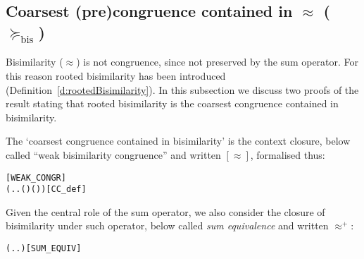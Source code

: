 
\subsection{Coarsest (pre)congruence contained in $\approx$ ($\succeq_{\mathrm{bis}}$)}
\label{s:coarsest}


Bisimilarity ($\approx$) is not  congruence, since not preserved by 
the sum operator. For this reason rooted bisimilarity has been
introduced (Definition~\ref{d:rootedBisimilarity}). 
In this subsection we discuss  two proofs of the result stating that
rooted bisimilarity is the coarsest congruence contained in
bisimilarity.

The `coarsest congruence contained in bisimilarity' is 
the context closure, below called 
``weak bisimilarity congruence'' and written $[\approx]$, formalised thus:
\begin{alltt}
 \HOLSymConst{=}  \hfill{[WEAK_CONGR]}
  \HOLSymConst{=} (\HOLTokenLambda{} . \HOLSymConst{\HOLTokenForall{}}.   \HOLSymConst{\HOLTokenImp{}}  ( ) ( ))\hfill{[CC_def]}
\end{alltt}

Given the central role of the  
 sum operator, we also consider the closure of bisimilarity under such
 operator, 
below called \emph{sum equivalence} and written $\approx^+$:
\begin{alltt}
 \HOLSymConst{=} (\HOLTokenLambda{} . \HOLSymConst{\HOLTokenForall{}}.  \HOLSymConst{+}  \HOLSymConst{\HOLTokenWeakEQ}  \HOLSymConst{+} )\hfill{[SUM_EQUIV]}
\end{alltt}


